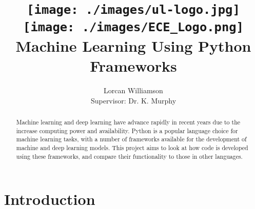 \documentclass[12pt,a4paper,titlepage,twoside]{report}
\title{
  \texttt{[image: ./images/ul-logo.jpg]}
  \hspace{1cm}
  \texttt{[image: ./images/ECE\_Logo.png]}
  Machine Learning Using Python Frameworks
}
\author{Lorcan Williamson\\Supervisor: Dr. K. Murphy}
\begin{document}
\maketitle

\begin{abstract}
	Machine learning and deep learning have advance rapidly in recent years due to the increase computing power and availability. Python is a popular language choice for machine learning tasks, with a number of frameworks available for the development of machine and deep learning models. This project aims to look at how code is developed using these frameworks, and compare their functionality to those in other languages.
\end{abstract}

\tableofcontents
\newpage

\chapter{Introduction}
	
\end{document}
